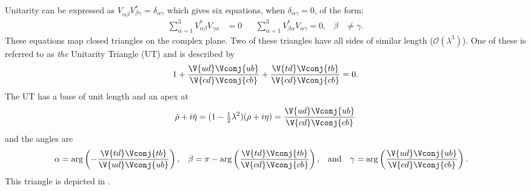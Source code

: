 Unitarity can be expressed as
$V_{\alpha\beta}^{\phantom{\dagger}}V_{\beta\gamma}^* = \delta_{\alpha\gamma}$
which gives six equations, when $\delta_{\alpha\gamma} = 0$, of the form:
\begin{align}
  \sum_{\alpha=1}^3V_{\alpha\beta}^*V_{\gamma\alpha}^{\phantom{*}} &= 0
  && \sum_{\alpha=1}^3V_{\beta\alpha}^*V_{\alpha\gamma}^{\phantom{*}}=0, & \beta&\neq\gamma.
  \label{eq:th:offdiag}
\end{align}
These equations map closed triangles on the complex plane.
Two of these triangles have all sides of similar length
($\mathcal{O}(\lambda^3)$).
One of these is referred to as \emph{the} Unitarity Triangle (UT) and is described by
\begin{equation}
  1 + \frac{\V{ud}\Vconj{ub}}{\V{cd}\Vconj{cb}} + \frac{\V{td}\Vconj{tb}}{\V{cd}\Vconj{cb}} = 0.
  \label{eq:th:ut}
\end{equation}
The UT has a base of unit length and an apex at
\begin{equation}
  \bar\rho+i\bar\eta = (1-\tfrac12\lambda^2)(\rho+i\eta) =
  \frac{\V{ud}\Vconj{ub}}{\V{cd}\Vconj{cb}}
\end{equation}
and the angles are
\begin{align}
  \alpha &=    \arg\left(-\frac{\V{td}\Vconj{tb}}{\V{ud}\Vconj{ub}}\right), &
  \beta  &=\pi-\arg\left( \frac{\V{td}\Vconj{tb}}{\V{cd}\Vconj{cb}}\right), & &\mathrm{and} &
  \gamma &=    \arg\left( \frac{\V{ud}\Vconj{ub}}{\V{cd}\Vconj{cb}}\right).
\end{align}
This triangle is depicted in .

